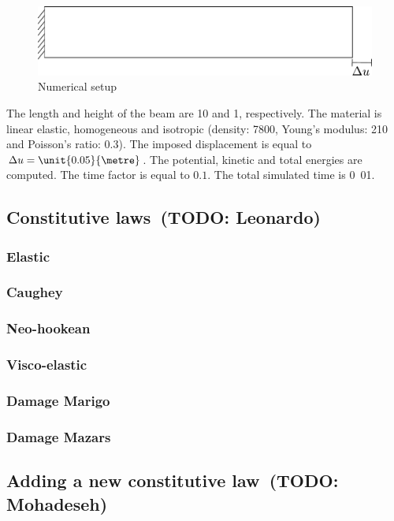 \documentclass[a4paper,11pt]{book}
\newcommand{\todo}[1]{~({\small\color{red}\textbf{TODO: }\textbf{#1}})}
\begin{document}
\begin{figure}[!htb]
  \centering
  \includegraphics[scale=.6]{figures/explicit_dynamic}
  \caption{Numerical setup \label{fig:smm:explicit}}
\end{figure}

The length  and height of  the beam are \unit{10}{\metre}  and \unit{1}{\metre},
respectively.   The  material  is  linear  elastic,  homogeneous  and  isotropic
(density:       \unit{7800}{\kilogrampercubicmetre},       Young's      modulus:
\unit{210}{\giga\pascal} and Poisson's  ratio: $0.3$).  The imposed displacement
is equal to  $\Delta u = \unit{0.05}{\metre}$. The  potential, kinetic and
total  energies are  computed.  The  time factor  is equal  to $0.1$.  The total
simulated time is \unit{0.01}{\second}.

\subsection{Constitutive laws\todo{Leonardo}}
\subsubsection{Elastic}
\subsubsection{Caughey}
\subsubsection{Neo-hookean}
\subsubsection{Visco-elastic}
\subsubsection{Damage Marigo}
\subsubsection{Damage Mazars}

\subsection{Adding a new constitutive law\todo{Mohadeseh}}
\end{document}
